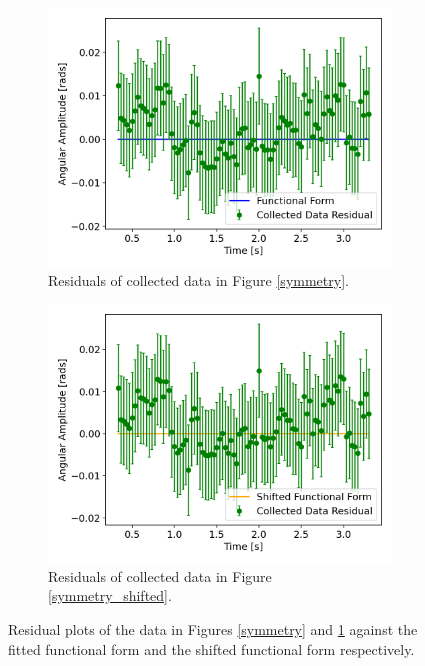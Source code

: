 \begin{figure}[H]
\centering
\begin{subfigure}[t]{0.5\textwidth}
  \centering
  \includegraphics[width=1\textwidth]{Plots/symmetry_plot_residual.png}
  \caption{\small{Residuals of collected data in Figure \ref{symmetry}.}}
  \label{symmetry_residual}
\end{subfigure}%
\begin{subfigure}[t]{.5\textwidth}
  \centering
  \includegraphics[width=\textwidth]{Plots/symmetry_shifted_residual.png}
  \caption{\small{Residuals of collected data in Figure \ref{symmetry_shifted}.}}
  \label{symmetry_shifted_residual}
\end{subfigure}
\caption{\small{Residual plots of the data in Figures \ref{symmetry} and \ref{symmetry_residual} against the fitted functional form and the shifted functional form respectively.}}
\end{figure}








